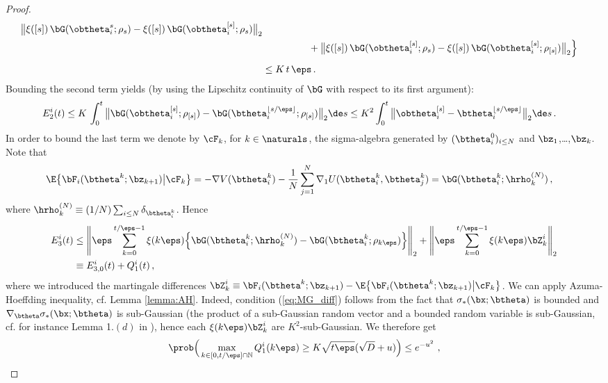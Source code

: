 \documentclass[11pt]{article}
\begin{document}
\begin{proof}
\begin{align}
\big\|\xi([s])\, \bG(\obtheta_i^s;\rho_s)-\xi([s])\, \bG(\obtheta_i^{[s]};\rho_{s})\big\|_2\nonumber\\
&\phantom{\le t\max_{s\in [0,t]}\Big\{}+ \big\|\xi([s])\, \bG(\obtheta_i^{[s]};\rho_s)-\xi([s])\, \bG(\obtheta_i^{[s]};\rho_{[s]})\big\|_2\Big\}\nonumber\\
&\le K\, t\, \eps\, . \label{eq:E1Bound}
%
\end{align}
%
Bounding the second term yields (by using the Lipschitz continuity of $\bG$ with respect to its first argument):
%
\begin{align}
%
E_2^i(t)& \le K\, \int_0^t \big\|\bG(\obtheta_i^{[s]};\rho_{[s]}) - \bG(\btheta_i^{\lfloor s/\eps\rfloor};\rho_{[s]})\big\|_2\de s \le K^2 \int_0^t  \big\|\obtheta_i^{[s]}-\btheta_i^{\lfloor s/\eps\rfloor }\big\|_2\de s\, . \label{eq:E2Bound}
%
\end{align}
%
In order to bound the last term we denote by $\cF_k$, for $k\in\naturals$, the sigma-algebra generated by $(\btheta^0_i)_{i\le N}$
and $\bz_1$,\dots,$\bz_k$.
Note that 
\begin{align}
%
\E\big\{\bF_i(\btheta^{k};\bz_{k+1})\big|\cF_{k}\big\}&= -\nabla V(\btheta_i^k) -\frac{1}{N}\sum_{j=1}^N\nabla_1 U(\btheta^k_i,\btheta^k_j) =  \bG(\btheta_i^k;\hrho^{(N)}_k)\,,
%
\end{align}
where $\hrho^{(N)}_k \equiv (1/N) \sum_{i \le N} \delta_{\btheta^k_i}$. Hence
%
\begin{align}
%
E_3^i(t)& \le \Bigg\|\eps \sum_{k=0}^{t/\eps-1}\xi(k\eps) \Big\{\bG(\btheta_i^{k};\hrho^{(N)}_{k})-\bG(\btheta_i^{k};\rho_{k\eps})\Big\}\Bigg\|_2+\Bigg\|\eps \sum_{k=0}^{t/\eps-1}\xi(k\eps)\bZ_k^i\Bigg\|_2\\
& \equiv E_{3,0}^i(t)+Q_1^i(t)\, ,\label{eq:E3Bound_First}
%
\end{align}
%
where we introduced the martingale differences $\bZ_k^i\equiv \bF_i(\btheta^{k};\bz_{k+1}) -\E\big\{\bF_i(\btheta^{k};\bz_{k+1})\big|\cF_{k}\big\}$.
We can apply  Azuma-Hoeffding inequality, cf. Lemma \ref{lemma:AH}.
Indeed, condition (\ref{eq:MG_diff}) follows from the fact that $\sigma_*(\bx;\btheta)$ is bounded and $\nabla_{\btheta}\sigma_*(\bx;\btheta)$ is
sub-Gaussian (the product of a sub-Gaussian random vector and a bounded random variable is sub-Gaussian, cf. for instance Lemma 1.$(d)$ 
in \cite{mei2016landscape}), hence each $\xi(k \eps) \bZ_k^i$ are $K^2$-sub-Gaussian. We therefore get
%
\begin{align}
\prob\Big(\max_{k \in  [0, t/\eps] \cap \mathbb N} Q_1^i( k \eps)\ge K\sqrt{t\eps } (\sqrt{D} + u) \Big)\le e^{-u^2}\, \,,\label{eq:BoundW10}

\end{align}
\end{proof}
\end{document}
